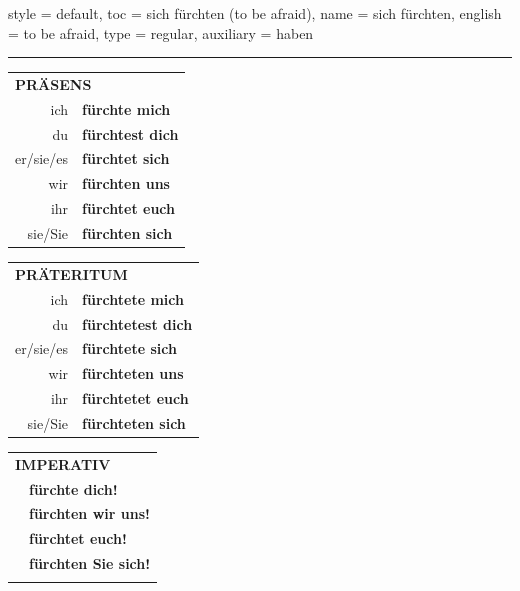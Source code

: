 \begin{verbentry}{
  style = {default},
  toc = {sich fürchten (to be afraid)},
  name = {sich fürchten},
  english = {to be afraid},
  type = {regular},
  auxiliary = {haben}
}
 
    
     \vspace{5pt}

    \hrule
    
    \vspace{5pt}

  \begin{tabular}{rl}
     \multicolumn{2}{l}{\textbf{PRÄSENS} }\\
    ich & \textbf{fürchte mich}\\
    du & \textbf{fürchtest dich}\\
    er/sie/es & \textbf{fürchtet sich}\\
    wir & \textbf{fürchten uns}\\
    ihr & \textbf{fürchtet euch}\\
    sie/Sie & \textbf{fürchten sich}\\
  \end{tabular}
  \hfill
     \begin{tabular}{rl}
    \multicolumn{2}{l}{\textbf{PRÄTERITUM} }\\
    ich & \textbf{fürchtete mich}\\
    du & \textbf{fürchtetest dich}\\
    er/sie/es & \textbf{fürchtete sich}\\
    wir & \textbf{fürchteten uns}\\
    ihr & \textbf{fürchtetet euch}\\
    sie/Sie & \textbf{fürchteten sich}\\
  \end{tabular}
  \hfill
  \begin{tabular}{rl}
     \multicolumn{2}{l}{\textbf{IMPERATIV} }\\
   & \textbf{fürchte dich!}\\
   & \textbf{fürchten wir uns!}\\
   & \textbf{fürchtet euch!}\\
   & \textbf{fürchten Sie sich!}\\
   & \vspace{10pt}
  \end{tabular}

    \vspace{10pt}


\end{verbentry}
